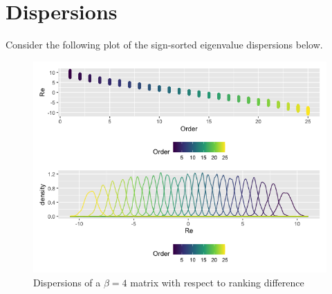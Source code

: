 \newpage
\section{Dispersions}

Consider the following plot of the sign-sorted eigenvalue dispersions below.

\begin{figure}[h]
	   
	       \centering
	    \includegraphics[scale = 0.6]{chapters/graphics/c2_order_sign}
	     \caption{Dispersions of a $\beta = 4$ matrix with respect to ranking difference}
	 \label{subd}
	\end{figure}


